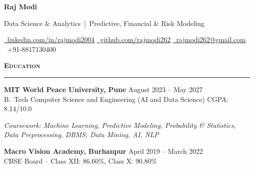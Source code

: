 \documentclass[a4paper,10pt]{article}
\newcommand{\sectionHeader}[2]{%
  \vspace{4pt}%
  \noindent%
  {\normalsize\bfseries\color{HeaderDark}#2\enspace\textsc{#1}}%
  \\[-6pt]%
  {\color{SectionLine}\rule{\textwidth}{1pt}}%
  \vspace{1pt}\par%
}
\newcommand{\eduEntry}[4]{%
  \vspace{1pt}%
  \noindent\textbf{\color{HeaderDark}#1} \hfill {\small\color{SubText}#2}\\[-3pt]%
  {\small\color{MidGray}#3} \hfill {\small\color{SubText}#4}%
  \vspace{0pt}\par%
}
\begin{document}

\begin{center}
  {\fontsize{24}{28}\selectfont\bfseries\color{HeaderDark}Raj Modi}

  \vspace{2pt}

  {\small\color{MidGray}Data Science \& Analytics \,|\, Predictive, Financial \& Risk Modeling}

  \vspace{3pt}

  {\small%
    \href{https://www.linkedin.com/in/rajmodi2004/}{{\color{AccentBlue}\faLinkedin}~\color{LinkBlue}linkedin.com/in/rajmodi2004}%
    \quad{\color{LightGray}|}%
    \quad\href{https://github.com/rajmodi262}{{\color{AccentBlue}\faGithub}~\color{LinkBlue}github.com/rajmodi262}%
    \quad{\color{LightGray}|}%
    \quad\href{mailto:rajmodi262@gmail.com}{{\color{AccentBlue}\faEnvelope}~\color{LinkBlue}rajmodi262@gmail.com}%
    \quad{\color{LightGray}|}%
    \quad{\color{AccentBlue}\faPhone*}~{\color{DarkGray}+91-8817130400}%
  }
\end{center}

\vspace{-2pt}


\sectionHeader{Education}{\faGraduationCap}

\eduEntry{MIT World Peace University, Pune}
  {August 2023 -- May 2027}
  {B.\ Tech Computer Science and Engineering (AI and Data Science)}
  {CGPA: 8.14/10.0}

\vspace{1pt}
{\footnotesize\color{SubText}\textit{Coursework: Machine Learning, Predictive Modeling, Probability \& Statistics, Data Preprocessing, DBMS, Data Mining, AI, NLP}\par}

\eduEntry{Macro Vision Academy, Burhanpur}
  {April 2019 -- March 2022}
  {CBSE Board -- Class XII: 86.60\%, Class X: 90.80\%}
  {}

\end{document}

